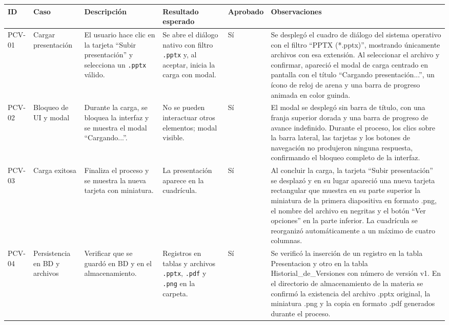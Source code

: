 \documentclass[11pt]{article}
\begin{document}
{\tiny
\renewcommand{\arraystretch}{1.15}
\begin{longtable}{@{}|L{1.2cm}|L{2.5cm}|L{3.4cm}|L{3.8cm}|L{1.5cm}|L{2.3cm}|@{}}
\hline
\textbf{ID} & \textbf{Caso} & \textbf{Descripción} & \textbf{Resultado esperado} & \textbf{Aprobado} & \textbf{Observaciones} \\ \hline
\endhead
PCV-01 & Cargar presentación & El usuario hace clic en la tarjeta ``Subir presentación'' y selecciona un \texttt{.pptx} válido. & Se abre el diálogo nativo con filtro \texttt{.pptx} y, al aceptar, inicia la carga con modal. & Sí & Se desplegó el cuadro de diálogo del sistema operativo con el filtro “PPTX (*.pptx)”, mostrando únicamente archivos con esa extensión. Al seleccionar el archivo y confirmar, apareció el modal de carga centrado en pantalla con el título “Cargando presentación...”, un ícono de reloj de arena y una barra de progreso animada en color guinda. \\ \hline
PCV-02 & Bloqueo de UI y modal & Durante la carga, se bloquea la interfaz y se muestra el modal ``Cargando...''. & No se pueden interactuar otros elementos; modal visible. & Sí & El modal se desplegó sin barra de título, con una franja superior dorada y una barra de progreso de avance indefinido. Durante el proceso, los clics sobre la barra lateral, las tarjetas y los botones de navegación no produjeron ninguna respuesta, confirmando el bloqueo completo de la interfaz. \\ \hline
PCV-03 & Carga exitosa & Finaliza el proceso y se muestra la nueva tarjeta con miniatura. & La presentación aparece en la cuadrícula. & Sí & Al concluir la carga, la tarjeta “Subir presentación” se desplazó y en su lugar apareció una nueva tarjeta rectangular que muestra en su parte superior la miniatura de la primera diapositiva en formato .png, el nombre del archivo en negritas y el botón “Ver opciones” en la parte inferior. La cuadrícula se reorganizó automáticamente a un máximo de cuatro columnas. \\ \hline
PCV-04 & Persistencia en BD y archivos & Verificar que se guardó en BD y en el almacenamiento. & Registros en tablas y archivos \texttt{.pptx}, \texttt{.pdf} y \texttt{.png} en la carpeta. & Sí & Se verificó la inserción de un registro en la tabla Presentacion y otro en la tabla Historial\_de\_Versiones con número de versión v1. En el directorio de almacenamiento de la materia se confirmó la existencia del archivo .pptx original, la miniatura .png y la copia en formato .pdf generados durante el proceso. \\ \hline

\end{longtable}}
\end{document}
